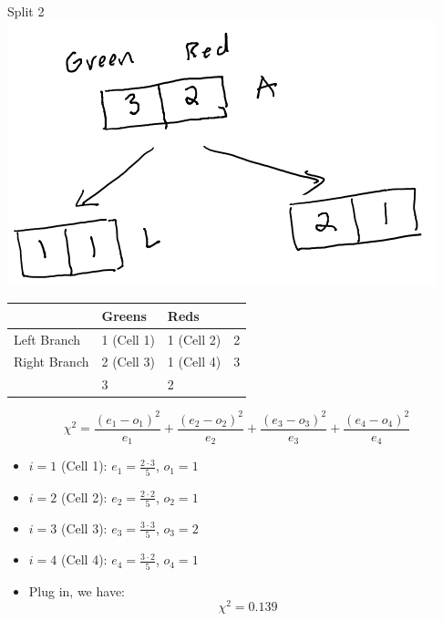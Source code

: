 \documentclass[
  ignorenonframetext,
]{beamer}
\begin{document}
\begin{frame}{Split 2}
\protect\hypertarget{split-2}{}
\includegraphics{images/im3.png}

\begin{longtable}[]{@{}llll@{}}
\toprule
& Greens & Reds & \\
\midrule
\endhead
Left Branch & 1 (Cell 1) & 1 (Cell 2) & 2 \\
Right Branch & 2 (Cell 3) & 1 (Cell 4) & 3 \\
& 3 & 2 & \\
\bottomrule
\end{longtable}

\[\chi^2 = \frac{(e_1-o_1)^2}{e_1}+\frac{(e_2-o_2)^2}{e_2}+\frac{(e_3-o_3)^2}{e_3}+\frac{(e_4-o_4)^2}{e_4}\]

\begin{itemize}
\item
  \(i=1\) (Cell 1): \(e_1 = \frac{2\cdot 3}{5}\), \(o_1 = 1\)
\item
  \(i=2\) (Cell 2): \(e_2 = \frac{2\cdot 2}{5}\), \(o_2 = 1\)
\item
  \(i=3\) (Cell 3): \(e_3 = \frac{3\cdot 3}{5}\), \(o_3 = 2\)
\item
  \(i=4\) (Cell 4): \(e_4 = \frac{3\cdot 2}{5}\), \(o_4 = 1\)
\item
  Plug in, we have: \[\chi^2 = 0.139\]
\end{itemize}
\end{frame}
\end{document}
